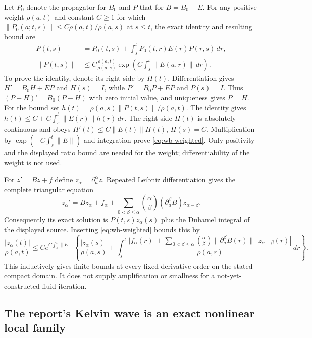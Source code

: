Let $P_0$ denote the propagator for $B_0$ and $P$ that for $B=B_0+E$.
For any positive weight $\rho(a,t)$ and constant $C\geq1$ for which
$\|P_0(a;t,s)\|\leq C\rho(a,t)/\rho(a,s)$ at $s\leq t$, the
exact identity and resulting bound are
\begin{align}
 P(t,s)&=P_0(t,s)+\int_s^tP_0(t,r)E(r)P(r,s)\,dr,\\
 \|P(t,s)\|&\leq
 C\frac{\rho(a,t)}{\rho(a,s)}
 \exp\left(C\int_s^t\|E(a,r)\|\,dr\right).
 \label{eq:wb-weighted}
\end{align}
To prove the identity, denote its right side by $H(t)$. Differentiation
gives $H'=B_0H+EP$ and $H(s)=I$, while
$P'=B_0P+EP$ and $P(s)=I$. Thus
$(P-H)'=B_0(P-H)$ with zero initial value, and uniqueness gives $P=H$.
For the bound set $h(t)=\rho(a,s)\|P(t,s)\|/\rho(a,t)$.
The identity gives $h(t)\leq C+C\int_s^t\|E(r)\|h(r)\,dr$.
The right side $H(t)$ is absolutely continuous and obeys
$H'(t)\leq C\|E(t)\|H(t)$, $H(s)=C$. Multiplication by
$\exp(-C\int_s^t\|E\|)$ and integration prove
\eqref{eq:wb-weighted}. Only positivity and the displayed ratio bound
are needed for the weight; differentiability of the weight is not used.

For $z'=Bz+f$ define $z_\alpha=\partial_a^\alpha z$. Repeated
Leibniz differentiation gives the complete triangular equation
\[
 z_\alpha'=Bz_\alpha+f_\alpha+
 \sum_{0<\beta\leq\alpha}\binom{\alpha}{\beta}
 (\partial_a^\beta B)z_{\alpha-\beta}.
\]
Consequently its exact solution is $P(t,s)z_\alpha(s)$ plus the
Duhamel integral of the displayed source. Inserting
\eqref{eq:wb-weighted} bounds this by
\[
 \frac{|z_\alpha(t)|}{\rho(a,t)}\leq
 C e^{C\int_s^t\|E\|}
 \left\{\frac{|z_\alpha(s)|}{\rho(a,s)}+
 \int_s^t\frac{|f_\alpha(r)|+
 \sum_{0<\beta\leq\alpha}\binom{\alpha}{\beta}
 \|\partial_a^\beta B(r)\|\,|z_{\alpha-\beta}(r)|}
 {\rho(a,r)}\,dr\right\}.
\]
This inductively gives finite bounds at every fixed derivative order on
the stated compact domain. It does not supply amplification or
smallness for a not-yet-constructed fluid iteration.

\subsection{The report's Kelvin wave is an exact nonlinear local family}

